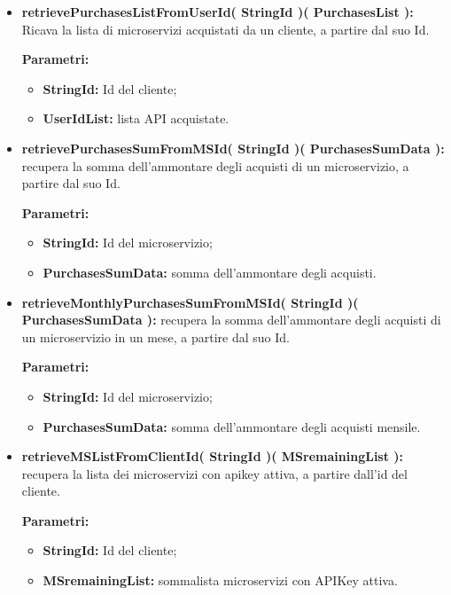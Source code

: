 \begin{itemize}
\begin{itemize}
			\item \textbf{retrievePurchasesListFromUserId( StringId )( PurchasesList ):} Ricava la lista di microservizi acquistati da un cliente, a partire dal suo Id.
				\begin{description}
					\item[\textbf{Parametri:}]
				\end{description}
				\begin{itemize}
					\item \textbf{StringId:} Id del cliente;
					\item \textbf{UserIdList:} lista API acquistate.
				\end{itemize}
	
			\item \textbf{retrievePurchasesSumFromMSId( StringId )( PurchasesSumData ):} recupera la somma dell'ammontare degli acquisti di un microservizio, a partire dal suo Id.
				\begin{description}
					\item[\textbf{Parametri:}]
				\end{description}
				\begin{itemize}
					\item \textbf{StringId:} Id del microservizio;
					\item \textbf{PurchasesSumData:} somma dell'ammontare degli acquisti.
				\end{itemize}
			
			\item \textbf{retrieveMonthlyPurchasesSumFromMSId( StringId )( PurchasesSumData ):} recupera la somma dell'ammontare degli acquisti di un microservizio in un mese, a partire dal suo Id.
				\begin{description}
					\item[\textbf{Parametri:}]
				\end{description}
				\begin{itemize}
					\item \textbf{StringId:} Id del microservizio;
					\item \textbf{PurchasesSumData:} somma dell'ammontare degli acquisti mensile.
				\end{itemize}
		
			\item \textbf{retrieveMSListFromClientId( StringId )( MSremainingList ):} recupera la lista dei microservizi con apikey attiva, a partire dall'id del cliente.
				\begin{description}
					\item[\textbf{Parametri:}]
				\end{description}
				\begin{itemize}
					\item \textbf{StringId:} Id del cliente;
					\item \textbf{MSremainingList:} sommalista microservizi con APIKey attiva.
				\end{itemize}
				

\end{itemize}
\end{itemize}
